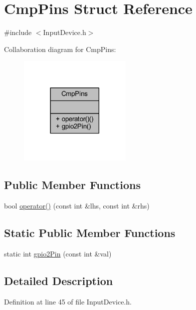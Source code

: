 \hypertarget{struct_cmp_pins}{}\section{Cmp\+Pins Struct Reference}
\label{struct_cmp_pins}


{\ttfamily \#include $<$Input\+Device.\+h$>$}



Collaboration diagram for Cmp\+Pins\+:
\nopagebreak
\begin{figure}[H]
\begin{center}
\leavevmode
\includegraphics[width=153pt]{struct_cmp_pins__coll__graph}
\end{center}
\end{figure}
\subsection*{Public Member Functions}
\begin{DoxyCompactItemize}
\item 
bool \hyperlink{struct_cmp_pins_aa746fa4480accb4564e3dfe8c87fd230}{operator()} (const int \&lhs, const int \&rhs)
\end{DoxyCompactItemize}
\subsection*{Static Public Member Functions}
\begin{DoxyCompactItemize}
\item 
static int \hyperlink{struct_cmp_pins_ae0dd767a616074a3d053b0d7018f411d}{gpio2\+Pin} (const int \&val)
\end{DoxyCompactItemize}


\subsection{Detailed Description}


Definition at line 45 of file Input\+Device.\+h.



